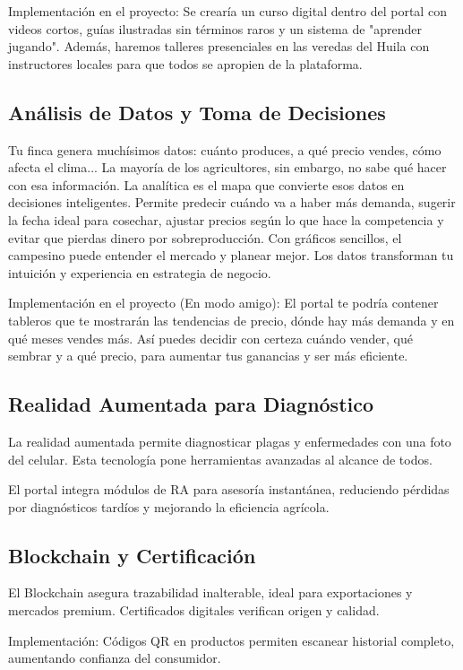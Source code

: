Implementación en el proyecto: Se crearía un curso digital dentro del portal con videos cortos, guías ilustradas sin términos raros y un sistema de "aprender jugando". Además, haremos talleres presenciales en las veredas del Huila con instructores locales para que todos se apropien de la plataforma.

\subsection{Análisis de Datos y Toma de Decisiones}
Tu finca genera muchísimos datos: cuánto produces, a qué precio vendes, cómo afecta el clima... La mayoría de los agricultores, sin embargo, no sabe qué hacer con esa información. La analítica es el mapa que convierte esos datos en decisiones inteligentes. Permite predecir cuándo va a haber más demanda, sugerir la fecha ideal para cosechar, ajustar precios según lo que hace la competencia y evitar que pierdas dinero por sobreproducción. Con gráficos sencillos, el campesino puede entender el mercado y planear mejor. Los datos transforman tu intuición y experiencia en estrategia de negocio.

Implementación en el proyecto (En modo amigo): El portal te podría contener tableros que te mostrarán las tendencias de precio, dónde hay más demanda y en qué meses vendes más. Así puedes decidir con certeza cuándo vender, qué sembrar y a qué precio, para aumentar tus ganancias y ser más eficiente.

\subsection{Realidad Aumentada para Diagnóstico}
La realidad aumentada permite diagnosticar plagas y enfermedades con una foto del celular. Esta tecnología pone herramientas avanzadas al alcance de todos.

El portal integra módulos de RA para asesoría instantánea, reduciendo pérdidas por diagnósticos tardíos y mejorando la eficiencia agrícola.

\subsection{Blockchain y Certificación}
El Blockchain asegura trazabilidad inalterable, ideal para exportaciones y mercados premium. Certificados digitales verifican origen y calidad.

Implementación: Códigos QR en productos permiten escanear historial completo, aumentando confianza del consumidor.

